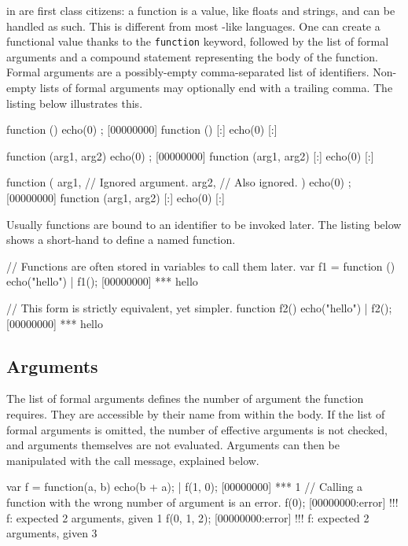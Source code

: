  in \us are first class citizens: a function is a
value, like floats and strings, and can be handled as such.  This is
different from most \C-like languages.  One can create a functional
value thanks to the \lstinline|function| keyword, followed by the list
of formal arguments and a compound statement representing the body of
the function. Formal arguments are a possibly-empty comma-separated
list of identifiers.  Non-empty lists of formal arguments may
optionally end with a trailing comma. The listing below illustrates
this.

\begin{urbiscript}[firstnumber=last]
function () { echo(0) };
[00000000] function () {
[:]  echo(0)
[:]}

function (arg1, arg2) { echo(0) };
[00000000] function (arg1, arg2) {
[:]  echo(0)
[:]}

function (
           arg1, // Ignored argument.
           arg2, // Also ignored.
          )
{
  echo(0)
};
[00000000] function (arg1, arg2) {
[:]  echo(0)
[:]}
\end{urbiscript}

Usually functions are bound to an identifier to be invoked later.
The listing below shows a short-hand to define a named
function.

\begin{urbiscript}[firstnumber=last]
// Functions are often stored in variables to call them later.
var f1 = function () {
  echo("hello")
}|
f1();
[00000000] *** hello

// This form is strictly equivalent, yet simpler.
function f2()
{
  echo("hello")
}|
f2();
[00000000] *** hello
\end{urbiscript}


\subsection{Arguments}

The list of formal arguments defines the number of argument the
function requires. They are accessible by their name from within the
body. If the list of formal arguments is omitted, the number of
effective arguments is not checked, and arguments themselves are not
evaluated. Arguments can then be manipulated with the call message,
explained below.

\begin{urbiscript}[firstnumber=last]
var f = function(a, b) {
  echo(b + a);
}|
f(1, 0);
[00000000] *** 1
// Calling a function with the wrong number of argument is an error.
f(0);
[00000000:error] !!! f: expected 2 arguments, given 1
f(0, 1, 2);
[00000000:error] !!! f: expected 2 arguments, given 3
\end{urbiscript}

